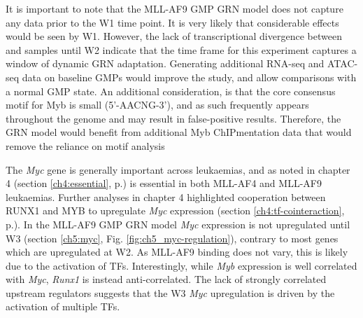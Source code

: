 It is important to note that the MLL-AF9 GMP GRN model does not capture any data prior to the W1 time point. It is very likely that considerable effects would be seen by W1. However, the lack of transcriptional divergence between \mybwt{} and \mybmre{} samples until W2 indicate that the time frame for this experiment captures a window of dynamic GRN adaptation. Generating additional RNA-seq and ATAC-seq data on baseline GMPs would improve the study, and allow comparisons with a normal GMP state. An additional consideration, is that the core consensus motif for Myb is small (5'-AACNG-3'), and as such frequently appears throughout the genome and may result in false-positive results. Therefore, the GRN model would benefit from additional Myb ChIPmentation data that would remove the reliance on motif analysis

The \textit{Myc} gene is generally important across leukaemias, and as noted in chapter 4 (section \ref{ch4:essential}, p.\pageref{ch4:essential}) is essential in both MLL-AF4 and MLL-AF9 leukaemias. Further analyses in chapter 4 highlighted cooperation between RUNX1 and MYB to upregulate \textit{Myc} expression (section \ref{ch4:tf-cointeraction}, p.\pageref{ch4:tf-cointeraction}). In the MLL-AF9 GMP GRN model \textit{Myc} expression is not upregulated until W3 (section \ref{ch5:myc}, Fig. \ref{fig:ch5_myc-regulation}), contrary to most genes which are upregulated at W2. As MLL-AF9 binding does not vary, this is likely due to the activation of TFs. Interestingly, while \textit{Myb} expression is well correlated with \textit{Myc}, \textit{Runx1} is instead anti-correlated. The lack of strongly correlated upstream regulators suggests that the W3 \textit{Myc} upregulation is driven by the activation of multiple TFs.

